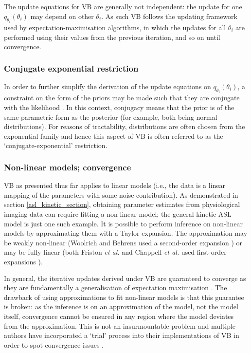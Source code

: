 The update equations for VB are generally not independent: the update for one $q_{\theta_i}(\theta_i)$ may depend on other $\theta_i$. As such VB follows the updating framework used by expectation-maximisation algorithms, in which the updates for all $\theta_i$ are performed using their values from the previous iteration, and so on until convergence.

\subsubsection{Conjugate exponential restriction}

In order to further simplify the derivation of the update equations on $q_{\theta_i}(\theta_i)$, a constraint on the form of the priors may be made such that they are conjugate with the likelihood \cite{Chappell2009}. In this context, conjugacy means that the prior is of the same parametric form as the posterior (for example, both being normal distributions). For reasons of tractability, distributions are often chosen from the exponential family and hence this aspect of VB is often referred to as the `conjugate-exponential' restriction. 

\subsubsection{Non-linear models; convergence}

VB as presented thus far applies to linear models (i.e., the data is a linear mapping of the parameters with some noise contribution). As demonstrated in section \ref{asl_kinetic_section}, obtaining parameter estimates from physiological imaging data can require fitting a non-linear model; the general kinetic ASL model is just one such example. It is possible to perform inference on non-linear models by approximating them with a Taylor expansion. The approximation may be weakly non-linear (Woolrich and Behrens used a second-order expansion \cite{Woolrich2006}) or may be fully linear (both Friston \textit{et al.} and Chappell \textit{et al.} used first-order expansions \cite{Chappell2009, Friston2007}). 

In general, the iterative updates derived under VB are guaranteed to converge as they are fundamentally a generalisation of expectation maximisation \cite{Attias2000}. The drawback of using approximations to fit non-linear models is that this guarantee is broken: as the inference is on an approximation of the model, not the model itself, convergence cannot be ensured in any region where the model deviates from the approximation. This is not an insurmountable problem and multiple authors have incorporated a `trial' process into their implementations of VB in order to spot convergence issues \cite{Chappell2009, Friston2007}. 

